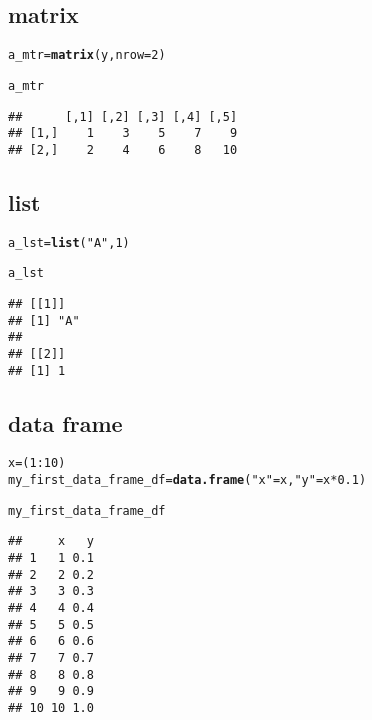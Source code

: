 \documentclass[a4paper,10pt]{book}\usepackage[]{graphicx}\usepackage[]{color}
\makeatletter
\newcommand{\hlnum}[1]{\textcolor[rgb]{0.686,0.059,0.569}{#1}}%
\newcommand{\hlstr}[1]{\textcolor[rgb]{0.192,0.494,0.8}{#1}}%
\newcommand{\hlopt}[1]{\textcolor[rgb]{0,0,0}{#1}}%
\newcommand{\hlstd}[1]{\textcolor[rgb]{0.345,0.345,0.345}{#1}}%
\newcommand{\hlkwb}[1]{\textcolor[rgb]{0.69,0.353,0.396}{#1}}%
\newcommand{\hlkwc}[1]{\textcolor[rgb]{0.333,0.667,0.333}{#1}}%
\newcommand{\hlkwd}[1]{\textcolor[rgb]{0.737,0.353,0.396}{\textbf{#1}}}%
\newenvironment{kframe}{%
 \def\at@end@of@kframe{}%
 \ifinner\ifhmode%
  \def\at@end@of@kframe{\end{minipage}}%
  \begin{minipage}{\columnwidth}%
 \fi\fi%
 \def\FrameCommand##1{\hskip\@totalleftmargin \hskip-\fboxsep
 \colorbox{shadecolor}{##1}\hskip-\fboxsep
     \hskip-\linewidth \hskip-\@totalleftmargin \hskip\columnwidth}%
 \MakeFramed {\advance\hsize-\width
   \@totalleftmargin\z@ \linewidth\hsize
   \@setminipage}}%
 {\par\unskip\endMakeFramed%
 \at@end@of@kframe}
\newenvironment{knitrout}{}{} %
\makeatother
\begin{document}
\subsection{matrix}

\begin{knitrout}
\color{fgcolor}\begin{kframe}
\begin{alltt}
\hlstd{a_mtr} \hlkwb{=} \hlkwd{matrix}\hlstd{(y,} \hlkwc{nrow}\hlstd{=}\hlnum{2}\hlstd{)}

\hlstd{a_mtr}
\end{alltt}
\begin{verbatim}
##      [,1] [,2] [,3] [,4] [,5]
## [1,]    1    3    5    7    9
## [2,]    2    4    6    8   10
\end{verbatim}
\end{kframe}
\end{knitrout}

\subsection{list}

\begin{knitrout}
\color{fgcolor}\begin{kframe}
\begin{alltt}
\hlstd{a_lst} \hlkwb{=} \hlkwd{list}\hlstd{(}\hlstr{"A"}\hlstd{,} \hlnum{1}\hlstd{)}

\hlstd{a_lst}
\end{alltt}
\begin{verbatim}
## [[1]]
## [1] "A"
## 
## [[2]]
## [1] 1
\end{verbatim}
\end{kframe}
\end{knitrout}


\subsection{data frame}

\begin{knitrout}
\color{fgcolor}\begin{kframe}
\begin{alltt}
\hlstd{x} \hlkwb{=} \hlstd{(}\hlnum{1}\hlopt{:}\hlnum{10}\hlstd{)}
\hlstd{my_first_data_frame_df} \hlkwb{=} \hlkwd{data.frame}\hlstd{(}\hlstr{"x"}\hlstd{=x,} \hlstr{"y"}\hlstd{=x}\hlopt{*}\hlnum{0.1} \hlstd{)}

\hlstd{my_first_data_frame_df}
\end{alltt}
\begin{verbatim}
##     x   y
## 1   1 0.1
## 2   2 0.2
## 3   3 0.3
## 4   4 0.4
## 5   5 0.5
## 6   6 0.6
## 7   7 0.7
## 8   8 0.8
## 9   9 0.9
## 10 10 1.0
\end{verbatim}
\end{kframe}
\end{knitrout}
\end{document}

